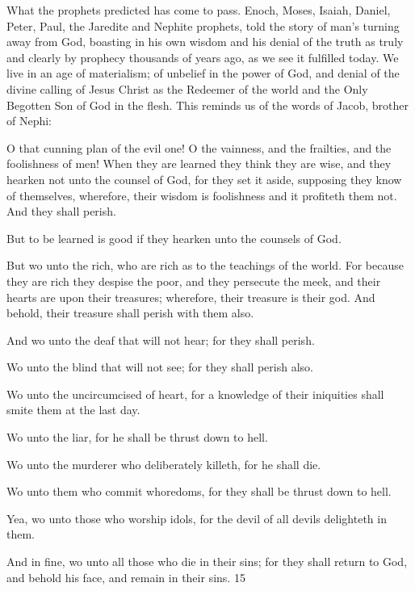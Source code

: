 What the prophets predicted has come to pass. Enoch, Moses, Isaiah, Daniel, Peter, Paul, the
Jaredite and Nephite prophets, told the story of man's turning away from God, boasting in his
own wisdom and his denial of the truth as truly and clearly by prophecy thousands of years
ago, as we see it fulfilled today. We live in an age of materialism; of unbelief in the power of
God, and denial of the divine calling of Jesus Christ as the Redeemer of the world and the
Only Begotten Son of God in the flesh. This reminds us of the words of Jacob, brother of
Nephi:

O that cunning plan of the evil one! O the vainness, and the frailties, and the foolishness of
men! When they are learned they think they are wise, and they hearken not unto the counsel
of God, for they set it aside, supposing they know of themselves, wherefore, their wisdom is
foolishness and it profiteth them not. And they shall perish.

But to be learned is good if they hearken unto the counsels of God.

But wo unto the rich, who are rich as to the teachings of the world. For because they are rich
they despise the poor, and they persecute the meek, and their hearts are upon their treasures;
wherefore, their treasure is their god. And behold, their treasure shall perish with them also.

And wo unto the deaf that will not hear; for they shall perish.

Wo unto the blind that will not see; for they shall perish also.

Wo unto the uncircumcised of heart, for a knowledge of their iniquities shall smite them at
the last day.

Wo unto the liar, for he shall be thrust down to hell.

Wo unto the murderer who deliberately killeth, for he shall die.

Wo unto them who commit whoredoms, for they shall be thrust down to hell.

Yea, wo unto those who worship idols, for the devil of all devils delighteth in them.

And in fine, wo unto all those who die in their sins; for they shall return to God, and behold
his face, and remain in their sins. 15

